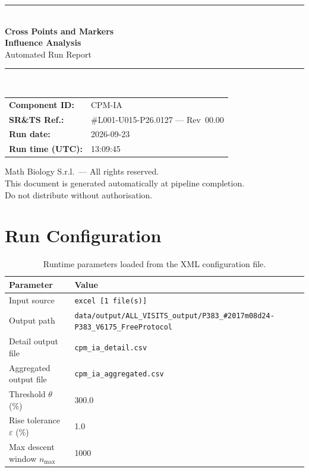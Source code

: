 \documentclass[a4paper,11pt]{article}
\begin{document}
\begin{titlepage}
\begin{center}
  \vspace*{1.8cm}
  {\color{dmaaccent}\rule{\linewidth}{1.5pt}}\\[0.6cm]
  {\LARGE\bfseries\color{dmaaccent}
    Cross Points and Markers\\[0.25cm]
    Influence Analysis}\\[0.4cm]
  {\Large Automated Run Report}\\[0.3cm]
  {\color{dmaaccent}\rule{\linewidth}{1.5pt}}\\[2cm]

  \begin{tabular}{ll}
    \textbf{Component ID:}   & CPM-IA \\[0.3cm]
    \textbf{SR\&TS Ref.:}    & \#L001-U015-P26.0127 --- Rev~00.00 \\[0.3cm]
    \textbf{Run date:}       & 2026-09-23 \\[0.3cm]
    \textbf{Run time (UTC):} & 13:09:45 \\
  \end{tabular}

  \vfill
  {\color{dmagray}\small
    Math Biology S.r.l.\ --- All rights reserved.\\
    This document is generated automatically at pipeline completion.\\
    Do not distribute without authorisation.}
\end{center}
\end{titlepage}

\tableofcontents
\clearpage

\section{Run Configuration}

\begin{table}[h!]
\centering
\small
\caption{Runtime parameters loaded from the XML configuration file.}
\begin{tabular}{ll}
\toprule
\textbf{Parameter} & \textbf{Value} \\
\midrule
Input source                      & \texttt{excel [1 file(s)]} \\
Output path                       & \texttt{data/output/ALL\_VISITS\_output/P383\_\#2017m08d24-P383\_V6175\_FreeProtocol} \\
Detail output file                & \texttt{cpm\_ia\_detail.csv} \\
Aggregated output file            & \texttt{cpm\_ia\_aggregated.csv} \\
Threshold $\theta$ (\%)           & 300.0 \\
Rise tolerance $\varepsilon$ (\%) & 1.0 \\
Max descent window $n_{\max}$     & 1000 \\
\bottomrule
\end{tabular}
\end{table}
\end{document}
